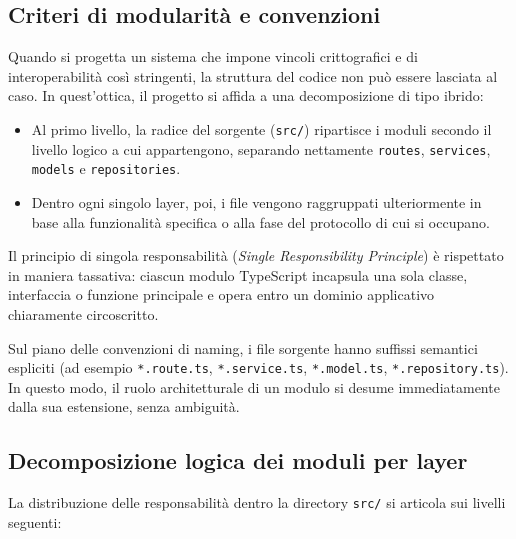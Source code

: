 \subsection{Criteri di modularità e convenzioni}
Quando si progetta un sistema che impone vincoli crittografici e di interoperabilità così stringenti, la struttura del codice non può essere lasciata al caso. In quest'ottica, il progetto si affida a una decomposizione di tipo ibrido:
\begin{itemize}
    \item Al primo livello, la radice del sorgente (\texttt{src/}) ripartisce i moduli secondo il livello logico a cui appartengono, separando nettamente \texttt{routes}, \texttt{services}, \texttt{models} e \texttt{repositories}.
    \item Dentro ogni singolo layer, poi, i file vengono raggruppati ulteriormente in base alla funzionalità specifica o alla fase del protocollo di cui si occupano.
\end{itemize}

Il principio di singola responsabilità (\textit{Single Responsibility Principle}) è rispettato in maniera tassativa: ciascun modulo TypeScript incapsula una sola classe, interfaccia o funzione principale e opera entro un dominio applicativo chiaramente circoscritto.

Sul piano delle convenzioni di naming, i file sorgente hanno suffissi semantici espliciti (ad esempio \texttt{*.route.ts}, \texttt{*.service.ts}, \texttt{*.model.ts}, \texttt{*.repository.ts}). In questo modo, il ruolo architetturale di un modulo si desume immediatamente dalla sua estensione, senza ambiguità.

\subsection{Decomposizione logica dei moduli per layer}
La distribuzione delle responsabilità dentro la directory \texttt{src/} si articola sui livelli seguenti:

